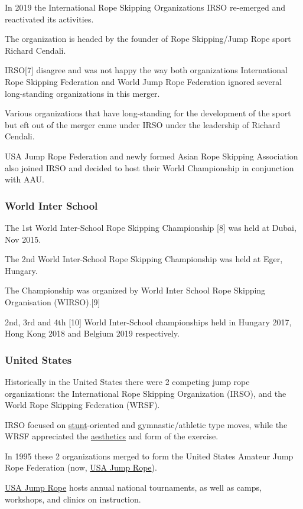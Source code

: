\documentclass[oneside]{book}
\numberwithin{equation}{section}
\begin{document}
%
In 2019 the International Rope Skipping Organizations IRSO re-emerged and reactivated its activities.

The organization is headed by the founder of Rope Skipping/Jump Rope sport Richard Cendali.

IRSO[7] disagree and was not happy the way both organizations International Rope Skipping Federation and World Jump Rope Federation ignored several long-standing organizations in this merger.

Various organizations that have long-standing for the development of the sport but eft out of the merger came under IRSO under the leadership of Richard Cendali.

USA Jump Rope Federation and newly formed Asian Rope Skipping Association also joined IRSO and decided to host their World Championship in conjunction with AAU.

\subsubsection{World Inter School}
The 1st World Inter-School Rope Skipping Championship [8] was held at Dubai, Nov 2015.

The 2nd World Inter-School Rope Skipping Championship was held at Eger, Hungary.

The Championship was organized by World Inter School Rope Skipping Organisation (WIRSO).[9]

2nd, 3rd and 4th [10] World Inter-School championships held in Hungary 2017, Hong Kong 2018 and Belgium 2019 respectively. 

\subsubsection{United States}
Historically in the United States there were 2 competing jump rope organizations: the International Rope Skipping Organization (IRSO), and the World Rope Skipping Federation (WRSF).

IRSO focused on \href{https://en.wikipedia.org/wiki/Stunt}{stunt}-oriented and gymnastic/athletic type moves, while the WRSF appreciated the \href{https://en.wikipedia.org/wiki/Aesthetics}{aesthetics} and form of the exercise.

In 1995 these 2 organizations merged to form the United States Amateur Jump Rope Federation (now, \href{http://www.usajumprope.org/}{USA Jump Rope}).

\href{http://www.usajumprope.org/}{USA Jump Rope} hosts annual national tournaments, as well as camps, workshops, and clinics on instruction.
\end{document}
